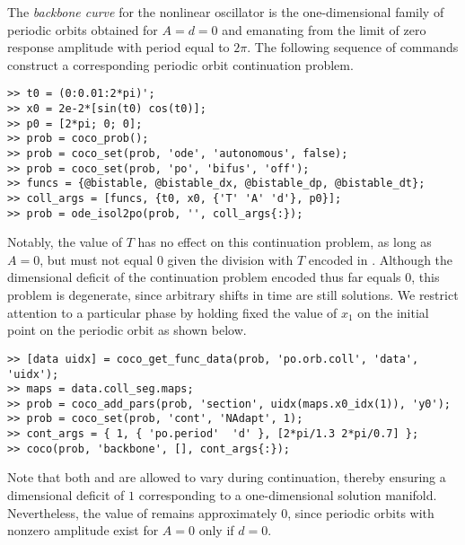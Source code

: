 The \emph{backbone curve} for the nonlinear oscillator is the one-dimensional family of periodic orbits obtained for $A=d=0$ and emanating from the limit of zero response amplitude with period equal to $2\pi$.
The following sequence of commands construct a corresponding periodic orbit continuation problem.
\begin{lstlisting}[language=coco-highlight]
>> t0 = (0:0.01:2*pi)';
>> x0 = 2e-2*[sin(t0) cos(t0)];
>> p0 = [2*pi; 0; 0];
>> prob = coco_prob();
>> prob = coco_set(prob, 'ode', 'autonomous', false);
>> prob = coco_set(prob, 'po', 'bifus', 'off');
>> funcs = {@bistable, @bistable_dx, @bistable_dp, @bistable_dt};
>> coll_args = [funcs, {t0, x0, {'T' 'A' 'd'}, p0}];
>> prob = ode_isol2po(prob, '', coll_args{:});
\end{lstlisting}
Notably, the value of $T$ has no effect on this continuation problem, as long as $A=0$, but must not equal $0$ given the division with $T$ encoded in . Although the dimensional deficit of the continuation problem encoded thus far equals $0$, this problem is degenerate, since arbitrary shifts in time are still solutions. We restrict attention to a particular phase by holding fixed the value of $x_1$ on the initial point on the periodic orbit as shown below.
\begin{lstlisting}[language=coco-highlight]
>> [data uidx] = coco_get_func_data(prob, 'po.orb.coll', 'data', 'uidx');
>> maps = data.coll_seg.maps;
>> prob = coco_add_pars(prob, 'section', uidx(maps.x0_idx(1)), 'y0');
>> prob = coco_set(prob, 'cont', 'NAdapt', 1);
>> cont_args = { 1, { 'po.period'  'd' }, [2*pi/1.3 2*pi/0.7] };
>> coco(prob, 'backbone', [], cont_args{:});
\end{lstlisting}
Note that both  and  are allowed to vary during continuation, thereby ensuring a dimensional deficit of $1$ corresponding to a one-dimensional solution manifold. Nevertheless, the value of  remains approximately $0$, since periodic orbits with nonzero amplitude exist for $A=0$ only if $d=0$.\\
\medskip

